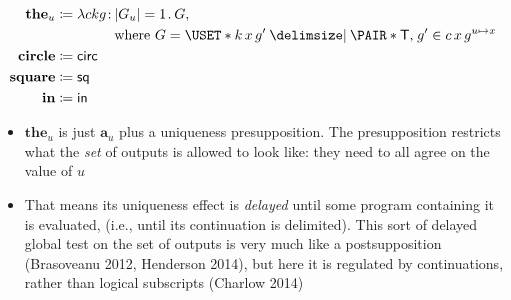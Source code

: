 \documentclass[10pt,fleqn]{article}
\begin{document}
\dotfill

\begin{minipage}[t]{0.5\textwidth} %
\begin{spreadlines}{0pt}
\begin{align*}
  \textbf{the}_u &\coloneq
    \l ckg \col |G_u| = 1 \dt G, \\
  &\hphantom{{}\coloneq \l ckg \col}
    \text{where}\ 
    G = \uset{k\,x\,g' \giv \pair{\cn{T}}{g'} \in c\,x\,g^{u\mapsto x}} \\
  \textbf{circle} &\coloneq
  \cn{circ} \\
  \textbf{square} &\coloneq
  \cn{sq} \\
  \textbf{in} &\coloneq
  \cn{in}
\end{align*}  
\end{spreadlines}
\end{minipage}
%
%
\begin{minipage}[t]{0.5\textwidth} %
\begin{spreadlines}{0pt}
\begin{itemize}
  \item
    $\textbf{the}_u$ is just $\textbf{a}_u$ plus a uniqueness presupposition.
    The presupposition restricts what the \emph{set} of outputs is allowed to
    look like: they need to all agree on the value of $u$
  \item
    That means its uniqueness effect is \emph{delayed} until some program
    containing it is evaluated, (i.e., until its continuation is delimited).
    This sort of delayed global test on the set of outputs is very much like a
    postsupposition (Brasoveanu 2012, Henderson 2014), but here it is
    regulated by continuations, rather than logical subscripts (Charlow 2014)
\end{itemize}
\end{spreadlines}
\end{minipage}

\dotfill
\end{document}
